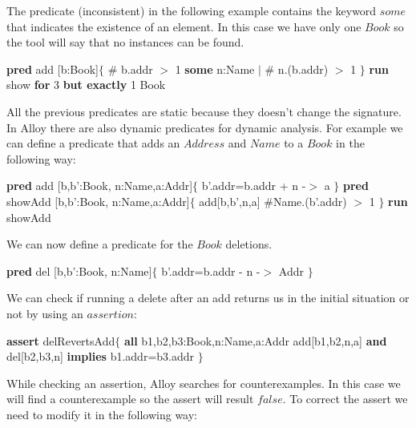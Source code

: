 \documentclass[12pt, a4paper]{report}
\newtheorem[style=M,bodystyle=\normalfont]{theorem}{Theorem}
\newtheorem[style=M,bodystyle=\normalfont]{corollary}{Corollary}
\newtheorem[style=M,bodystyle=\normalfont]{lemma}{Lemma}
\newtheorem[style=M,bodystyle=\normalfont]{definition}{Definition}
\begin{document}
        The predicate (inconsistent) in the following example contains the keyword $some$ that indicates the existence of an element. In this case we have only one $Book$ so the tool 
        will say that no instances can be found. 
        \begin{algorithmic}[H]
            \State \textbf{pred} add [b:Book]$\{$
            \State \:\:\:\:\:\: $\#$ b.addr $>$ 1
            \State \:\:\:\:\:\: \textbf{some} n:Name $\mid$ $\#$ n.(b.addr) $>$ 1
            \State $\}$
            \State \textbf{run} show \textbf{for} 3 \textbf{but exactly} 1 Book
        \end{algorithmic} 
        All the previous predicates are static because they doesn't change the signature. In Alloy there are also dynamic predicates for dynamic analysis. For example we can define a 
        predicate that adds an $Address$ and $Name$ to a $Book$ in the following way: 
        \begin{algorithmic}[H]
            \State \textbf{pred} add [b,b':Book, n:Name,a:Addr]$\{$
            \State \:\:\:\:\:\:\:\: b'.addr=b.addr + n -$>$ a
            \State $\}$
            \State \textbf{pred} showAdd [b,b':Book, n:Name,a:Addr]$\{$
            \State \:\:\:\:\:\:\:\: add[b,b',n,a]
            \State \:\:\:\:\:\:\:\: $\#$Name.(b'.addr) $>$ 1
            \State $\}$
            \State \textbf{run} showAdd
        \end{algorithmic} 
        We can now define a predicate for the $Book$ deletions.  
        \begin{algorithmic}[H]
            \State \textbf{pred} del [b,b':Book, n:Name]$\{$
            \State \:\:\:\:\:\:\:\: b'.addr=b.addr - n -$>$ Addr
            \State $\}$
        \end{algorithmic} 
        We can check if running a delete after an add returns us in the initial situation or not by using an $assertion$:
        \begin{algorithmic}[H]
            \State \textbf{assert} delRevertsAdd$\{$
            \State \:\:\:\:\:\:\:\: \textbf{all} b1,b2,b3:Book,n:Name,a:Addr
            \State \:\:\:\:\:\:\:\: add[b1,b2,n,a] \textbf{and} del[b2,b3,n] 
            \State \:\:\:\:\:\:\:\: \textbf{implies} b1.addr=b3.addr
            \State $\}$
        \end{algorithmic} 
        While checking an assertion, Alloy searches for counterexamples. In this case we will find a counterexample so the assert will result $false$. To correct the assert we need to 
        modify it in the following way: 
\end{document}
